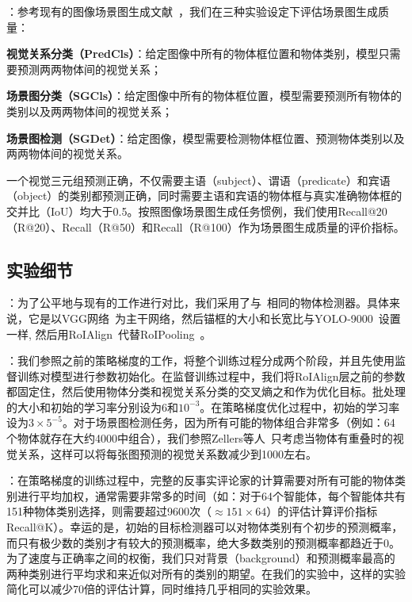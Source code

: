 \textbf{}：参考现有的图像场景图生成文献~\cite{xu2017scene, zellers2018neural, jae2018tensorize}，我们在三种实验设定下评估场景图生成质量：
\begin{asparaenum}
\item \textbf{视觉关系分类（PredCls）}：给定图像中所有的物体框位置和物体类别，模型只需要预测两两物体间的视觉关系；

\item \textbf{场景图分类（SGCls）}：给定图像中所有的物体框位置，模型需要预测所有物体的类别以及两两物体间的视觉关系；

\item \textbf{场景图检测（SGDet）}：给定图像，模型需要检测物体框位置、预测物体类别以及两两物体间的视觉关系。
\end{asparaenum}

一个视觉三元组预测正确，不仅需要主语（subject）、谓语（predicate）和宾语（object）的类别都预测正确，同时需要主语和宾语的物体框与真实准确物体框的交并比（IoU）均大于0.5。按照图像场景图生成任务惯例，我们使用Recall@20（R@20）、Recall（R@50）和Recall（R@100）作为场景图生成质量的评价指标。

\subsection{实验细节}

\textbf{}：为了公平地与现有的工作进行对比，我们采用了与~\cite{zellers2018neural}相同的物体检测器。具体来说，它是以VGG网络~\cite{simonyan2015very}为主干网络，然后锚框的大小和长宽比与YOLO-9000~\cite{redmon2017yolo9000}设置一样, 然后用RoIAlign~\cite{he2017mask}代替RoIPooling~\cite{girshick2014rich,girshick2015fast}。

\textbf{}：我们参照之前的策略梯度的工作，将整个训练过程分成两个阶段，并且先使用监督训练对模型进行参数初始化。在监督训练过程中，我们将RoIAlign层之前的参数都固定住，然后使用物体分类和视觉关系分类的交叉熵之和作为优化目标。批处理的大小和初始的学习率分别设为6和$10^{-3}$。在策略梯度优化过程中，初始的学习率设为$3\times5^{-5}$。对于场景图检测任务，因为所有可能的物体组合非常多（例如：64个物体就存在大约4000中组合），我们参照Zellers等人~\cite{zellers2018neural}只考虑当物体有重叠时的视觉关系，这样可以将每张图预测的视觉关系数减少到1000左右。

\textbf{}：在策略梯度的训练过程中，完整的反事实评论家的计算需要对所有可能的物体类别进行平均加权，通常需要非常多的时间（如：对于64个智能体，每个智能体共有151种物体类别选择，则需要超过9600次（$\approx 151 \times 64$）的评估计算评价指标Recall@K）。幸运的是，初始的目标检测器可以对物体类别有个初步的预测概率，而只有极少数的类别才有较大的预测概率，绝大多数类别的预测概率都趋近于0。为了速度与正确率之间的权衡，我们只对背景（background）和预测概率最高的两种类别进行平均求和来近似对所有的类别的期望。在我们的实验中，这样的实验简化可以减少70倍的评估计算，同时维持几乎相同的实验效果。


